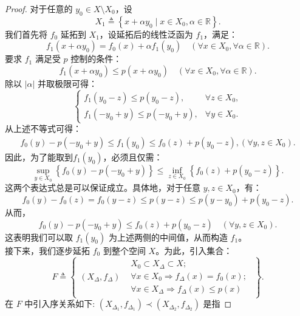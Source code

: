 \documentclass[lang=cn,newtx,10pt,scheme=chinese,thmcnt=chapter]{elegantbook}
\begin{document}
\begin{proof}
对于任意的 \( y_0 \in X \setminus X_0 \)，设  
\[
X_1 \triangleq \left\{x + \alpha y_0 \mid x \in X_0, \alpha \in \mathbb{R} \right\}.
\]
我们首先将 \( f_0 \) 延拓到 \( X_1 \)，设延拓后的线性泛函为 \( f_1 \)，满足：
\[
f_1\left(x + \alpha y_0\right) = f_0(x) + \alpha f_1(y_0) \quad (\forall x \in X_0, \forall \alpha \in \mathbb{R}).
\]
要求 \( f_1 \) 满足受 \( p \) 控制的条件：
\[
f_1\left(x + \alpha y_0\right) \leqslant p\left(x + \alpha y_0\right) \quad (\forall x \in X_0, \forall \alpha \in \mathbb{R}).
\]
除以 \( |\alpha| \) 并取极限可得：
\[
\begin{cases}
f_1\left(y_0 - z\right) \leqslant p\left(y_0 - z\right), & \forall z \in X_0, \\
f_1\left(-y_0 + y\right) \leqslant p\left(-y_0 + y\right), & \forall y \in X_0.
\end{cases}
\]
从上述不等式可得：
\[
\begin{gathered}
f_0(y) - p\left(-y_0 + y\right) \leqslant f_1\left(y_0\right) \leqslant f_0(z) + p\left(y_0 - z\right), (\forall y, z \in X_0).
\end{gathered}
\]
因此，为了能取到$f_1(y_0)$，必须且仅需：
\[
\sup_{y \in X_0} \left\{ f_0(y) - p\left(-y_0 + y\right) \right\} \leqslant \inf_{z \in X_0} \left\{ f_0(z) + p\left(y_0 - z\right) \right\}.
\]
这两个表达式总是可以保证成立。具体地，对于任意 \( y, z \in X_0 \)，有：
\[
f_0(y) - f_0(z) = f_0(y - z) \leqslant p(y - z) \leqslant p\left(y - y_0\right) + p\left(y_0 - z\right).
\]
从而，
\[
f_0(y) - p\left(-y_0 + y\right) \leqslant f_0(z) + p\left(y_0 - z\right) \quad (\forall y, z \in X_0).
\]
这表明我们可以取 \( f_1\left(y_0\right) \) 为上述两侧的中间值，从而构造 \( f_1 \)。
\\
接下来，我们逐步延拓 \( f_0 \) 到整个空间 \( X \)。为此，引入集合：
\begin{equation*}
F \triangleq\left\{\begin{array}{l|l}
\left( X _{\Delta}, f_{\Delta}\right) & \begin{array}{l} 
X _0 \subset X _{\Delta} \subset X ; \\
\forall x \in X _0 \Rightarrow f_{\Delta}(x)=f_0(x) ; \\
\forall x \in X _{\Delta} \Rightarrow f_{\Delta}(x) \leqslant p(x)
\end{array}
\end{array}\right\} .
\end{equation*}
在 $F$ 中引入序关系如下: $\left( X _{\Delta_1}, f_{\Delta_1}\right) \prec\left( X _{\Delta_2}, f_{\Delta_2}\right)$ 是指

\end{proof}
\end{document}
